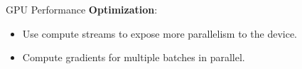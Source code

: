 \documentclass{beamer}
\begin{document}
\begin{frame}{GPU Performance}
  \textbf{Optimization}:
  \begin{itemize}
    \item Use compute streams to expose more parallelism to the device.
    \item Compute gradients for multiple batches in parallel.
  \end{itemize}
  \begin{center}
  \end{center}
\end{frame}
\end{document}
